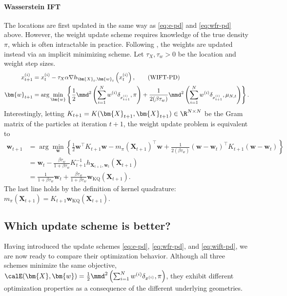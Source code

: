 \paragraph{Wasserstein IFT} 
The locations are first updated in the same 
way as \eqref{eq:e-pd} and \eqref{eq:wfr-pd} above. 
However, the weight update scheme requires knowledge of the true density $\pi$, which is often intractable in practice. 
Following \citet{gladin2024interaction}, the weights are updated instead via an implicit minimizing scheme. Let $\tau_X,\tau_w>0$ be the location and weight step sizes.
\begin{align}\label{eq:wift-pd}
    x_{t+1}^{(i)} &= x_t^{(i)}-\tau_X\alpha \nabla h_{\bm{X}_t,\bm{w}_t}\left(x_t^{(i)}\right), \tag{WIFT-PD} \\
    \bm{w}_{t+1} &= \arg \min _{\bm{w}} \left\{\frac{1}{2} \mmd^2\left(\sum_{i=1}^N w^{(i)} \delta_{x_{t+1}^{(i)}}, \pi\right) + \frac{1}{2 (\beta \tau_w)} \mmd^2 \left(\sum_{i=1}^N w^{(i)} \delta_{x_{t+1}^{(i)}}, \mu_{N,t}\right) \right\} \nonumber .
\end{align}
Interestingly, letting $K_{t+1}=K(\bm{X}_{t+1},\bm{X}_{t+1})\in\R^{N\times N}$ be the Gram matrix of the particles at iteration $t+1$, the weight update problem is equivalent to
\begin{align*}
    \bm{w}_{t+1} &= \arg \min_{\bm{w}} \left\{\frac{1}{2} \bm{w}^{\top} K_{t+1} \bm{w} - m_\pi(\bm{X}_{t+1})^{\top} \bm{w} + \frac{1}{2 (\beta \tau_w)} \left(\bm{w}-\bm{w}_t \right)^{\top} K_{t+1} \left(\bm{w}-\bm{w}_t\right)\right\} \\
    &= \bm{w}_t - \frac{\beta\tau_w}{1+\beta\tau_w} K_{t+1}^{-1} h_{\bm{X}_{t+1},\bm{w}_t} \left(\bm{X}_{t+1}\right) \\
    &= \frac{1}{1+\beta\tau_w} \bm{w}_t + \frac{\beta\tau_w}{1+\beta\tau_w} \bm{w}_{\mathrm{KQ}}(\bm{X}_{t+1}) .
\end{align*} 
The last line holds by the definition of kernel quadrature: $m_\pi(\bm{X}_{t+1}) = K_{t+1} \bm{w}_{\mathrm{KQ}}(\bm{X}_{t+1})$.


\subsection{Which update scheme is better?}
Having introduced the update schemes \eqref{eq:e-pd}, \eqref{eq:wfr-pd}, and \eqref{eq:wift-pd}, we are now ready to compare their optimization behavior. Although all three schemes minimize the same objective, $\calE(\bm{X},\bm{w}) = \frac{1}{2}\mmd^2\left(\sum_{i=1}^N w^{(i)}\delta_{x^{(i)}},\pi \right)$, they exhibit different optimization properties as a consequence of the different underlying geometries. 

